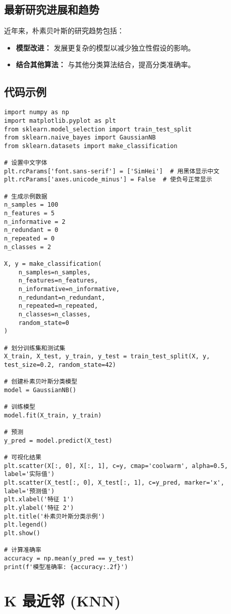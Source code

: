 \subsection*{最新研究进展和趋势}
近年来，朴素贝叶斯的研究趋势包括：
\begin{itemize}
    \item \textbf{模型改进：} 发展更复杂的模型以减少独立性假设的影响。
    \item \textbf{结合其他算法：} 与其他分类算法结合，提高分类准确率。
\end{itemize}
\subsection*{代码示例}
\begin{lstlisting}
import numpy as np
import matplotlib.pyplot as plt
from sklearn.model_selection import train_test_split
from sklearn.naive_bayes import GaussianNB
from sklearn.datasets import make_classification

# 设置中文字体
plt.rcParams['font.sans-serif'] = ['SimHei']  # 用黑体显示中文
plt.rcParams['axes.unicode_minus'] = False  # 使负号正常显示

# 生成示例数据
n_samples = 100
n_features = 5
n_informative = 2
n_redundant = 0
n_repeated = 0
n_classes = 2

X, y = make_classification(
    n_samples=n_samples,
    n_features=n_features,
    n_informative=n_informative,
    n_redundant=n_redundant,
    n_repeated=n_repeated,
    n_classes=n_classes,
    random_state=0
)

# 划分训练集和测试集
X_train, X_test, y_train, y_test = train_test_split(X, y, test_size=0.2, random_state=42)

# 创建朴素贝叶斯分类模型
model = GaussianNB()

# 训练模型
model.fit(X_train, y_train)

# 预测
y_pred = model.predict(X_test)

# 可视化结果
plt.scatter(X[:, 0], X[:, 1], c=y, cmap='coolwarm', alpha=0.5, label='实际值')
plt.scatter(X_test[:, 0], X_test[:, 1], c=y_pred, marker='x', label='预测值')
plt.xlabel('特征 1')
plt.ylabel('特征 2')
plt.title('朴素贝叶斯分类示例')
plt.legend()
plt.show()

# 计算准确率
accuracy = np.mean(y_pred == y_test)
print(f'模型准确率: {accuracy:.2f}')

\end{lstlisting}


\section{K 最近邻 (KNN)}
